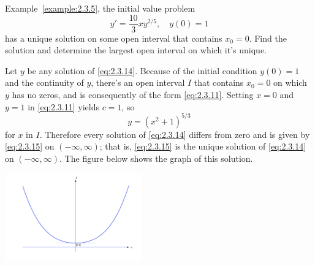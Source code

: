 \documentclass{ximera}
\begin{document}
\begin{example}
\begin{explanation}
\end{explanation}
\end{example}

\begin{example}\label{example:2.3.8}
\From Example~\ref{example:2.3.5}, the initial value
problem
\begin{equation} \label{eq:2.3.14}
y'=\frac{10}{3}xy^{2/5}, \quad y(0)=1
\end{equation}
 has a unique solution on some open interval that contains $x_0=0$.
Find the solution and determine the largest open interval on which it's
unique.
\begin{explanation}
Let $y$ be any solution of \eqref{eq:2.3.14}. Because of the initial
condition $y(0)=1$ and the continuity of $y$, there's an open interval
$I$ that contains $x_0=0$ on which $y$ has no zeros, and is consequently
of the form \eqref{eq:2.3.11}. Setting $x=0$ and $y=1$ in \eqref{eq:2.3.11}
yields $c=1$, so
\begin{equation} \label{eq:2.3.15}
y=(x^2+1)^{5/3}
\end{equation}
for $x$ in $I$. Therefore every solution of \eqref{eq:2.3.14}
differs from zero and is given by \eqref{eq:2.3.15} on $(-\infty,\infty)$;
that is, \eqref{eq:2.3.15} is the unique solution of \eqref{eq:2.3.14} on
$(-\infty,\infty)$.
The figure below shows the graph of this solution.

\begin{image}
 \includegraphics[height=1.5in]{fig020304.jpg}
\end{image}
\end{explanation}
\end{example}
\end{document}

